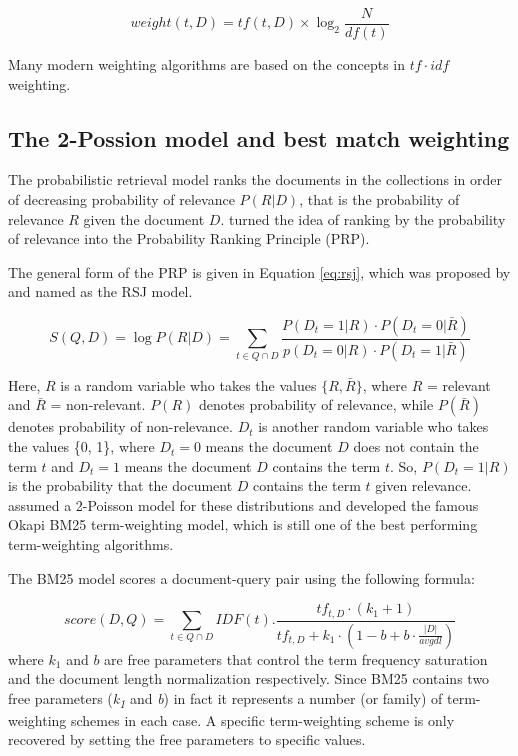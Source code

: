 \begin{equation} \label{eq:tfidf}
weight(t,D) = tf(t, D) \times \log _2 \frac{N}{df(t)}
\end{equation}

Many modern weighting algorithms are based on the concepts in $tf\cdot idf$ weighting.

\subsection{The 2-Possion model and best match weighting}

The probabilistic retrieval model ranks the documents in the collections in order of decreasing probability of relevance $P(R|D)$, that is the probability of relevance $R$ given the document $D$.
\citet{PRP} turned the idea of ranking by the probability of relevance into the Probability Ranking Principle (PRP).

The general form of the PRP is given in Equation \ref{eq:rsj}, which was proposed by \citet{RSJ} and named as the RSJ model.

\begin{equation} \label{eq:rsj}
S(Q,D) = \log P(R|D)  = \sum_{t \in Q \cap D} \frac{P(D_t=1 \vert R) \cdot P(D_t=0 \vert \bar{R})} {p(D_t=0 \vert R) \cdot P(D_t=1 \vert \bar{R})}
\end{equation}

Here, $R$ is a random variable who takes the values $\{R, \bar{R}\}$, where $R$ = relevant and $\bar{R}$ = non-relevant.
$P(R)$ denotes probability of relevance, while $P(\bar{R})$ denotes probability of non-relevance.
$D_t$ is another random variable who takes the values \{0, 1\}, where $D_t=0$ means the document $D$ does not contain the term $t$ and $D_t=1$ means the document $D$ contains the term $t$.
So, $P(D_t=1 \vert R)$ is the probability that the document $D$ contains the term $t$ given relevance.
\citet{2Poisson} assumed a 2-Poisson model for these distributions and developed the famous Okapi BM25 term-weighting model, which is still one of the best performing term-weighting algorithms.

The BM25 model scores a document-query pair using the following formula:

\begin{equation}\label{bm25}
score(D, Q)=\sum_{t \in Q \cap D} IDF(t) . \frac{tf_{t,D}\cdot(k_1+1)}{tf_{t,D}+k_1\cdot(1-b+b\cdot \frac{|D|}{avgdl})}
\end{equation}
where $k_1$ and $b$ are free parameters that control the term frequency saturation and the document length normalization respectively.
Since BM25 contains two free parameters (\emph{k\textsubscript{1}} and \emph{b}) in fact it represents a number (or family) of term-weighting schemes in each case. 
A specific term-weighting scheme is only recovered by setting the free parameters to specific values. 

